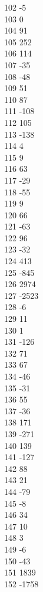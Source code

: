 { 102	-5 \\
 103	0 \\
 104	91 \\
 105	252 \\
 106	114 \\
 107	-35 \\
 108	-48 \\
 109	51 \\
 110	87 \\
 111	-108 \\
 112	105 \\
 113	-138 \\
 114	4 \\
 115	9 \\
 116	63 \\
 117	-29 \\
 118	-55 \\
 119	9 \\
 120	66 \\
 121	-63 \\
 122	96 \\
 123	-32 \\
 124	413 \\
 125	-845 \\
 126	2974 \\
 127	-2523 \\
 128	-6 \\
 129	11 \\
 130	1 \\
 131	-126 \\
 132	71 \\
 133	67 \\
 134	-46 \\
 135	-31 \\
 136	55 \\
 137	-36 \\
 138	171 \\
 139	-271 \\
 140	139 \\
 141	-127 \\
 142	88 \\
 143	21 \\
 144	-79 \\
 145	-8 \\
 146	34 \\
 147	10 \\
 148	3 \\
 149	-6 \\
 150	-43 \\
 151	1839 \\
 152	-1758 \\
}
